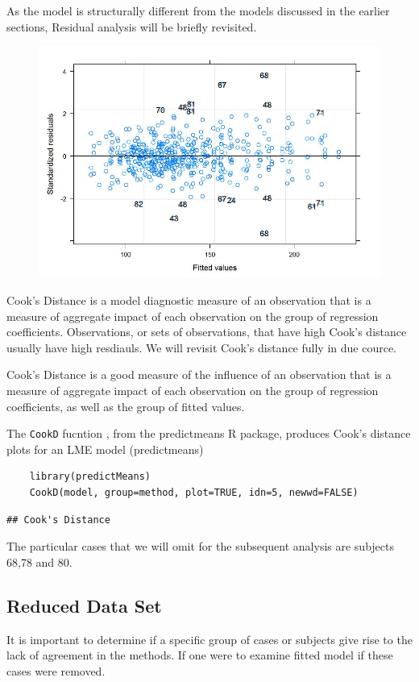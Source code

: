 \documentclass[12pt, a4paper]{report}
\theoremstyle{plain}
\theoremstyle{definition}
\theoremstyle{remark}
\begin{document}
As the model is structurally different from the models discussed in the earlier sections, Residual analysis will be briefly revisited.
\begin{figure}[h!]
	\centering
	\includegraphics[width=0.7\linewidth]{images/Residuals-JS-Roy}
	\caption{}
	\label{fig:Residuals-JS-Roy}
\end{figure}


Cook's Distance is a model diagnostic measure of an observation that is a measure of aggregate impact of each observation on the group of regression coefficients. Observations, or sets of observations, that have high Cook's distance usually have high resdiauls. We will revisit Cook's distance fully in due cource.

Cook's Distance is a good measure of the influence of an observation that is a measure of aggregate impact of each observation on the group of regression coefficients, as well as the group of fitted values.

The \texttt{CookD} fucntion , from the predictmeans R package, produces Cook’s distance plots for an LME model 
(predictmeans)



\begin{framed}
	\begin{verbatim}
	library(predictMeans)
	CookD(model, group=method, plot=TRUE, idn=5, newwd=FALSE)
	\end{verbatim}
\end{framed}


\begin{verbatim}
## Cook's Distance

\end{verbatim}

The particular cases that we will omit for the subsequent analysis are subjects 68,78 and 80.

\subsection{Reduced Data Set}
It is important to determine if a specific group of cases or subjects give rise to the lack of agreement in the methods. If one were to examine fitted model if these cases were removed.
\end{document}
